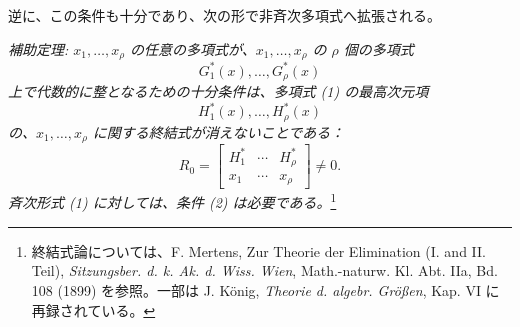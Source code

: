 \documentclass[11pt]{jlreq}
\begin{document}
逆に、この条件も十分であり、次の形で非斉次多項式へ拡張される。

\emph{補助定理: $x_1,\ldots,x_\rho$ の任意の多項式が、$x_1,\ldots,x_\rho$ の $\rho$ 個の多項式}
\[
  G_1^*(x),\ldots,G_\rho^*(x)
\]
\emph{上で代数的に整となるための十分条件は、多項式 (1) の最高次元項}
\[
  H_1^*(x),\ldots,H_\rho^*(x)
\]
\emph{の、$x_1,\ldots,x_\rho$ に関する終結式が消えないことである：}
\begin{equation}
  R_0=\left[
  \begin{array}{ccc}
    H_1^*&\cdots&H_\rho^*\\
    x_1&\cdots&x_\rho
  \end{array}
  \right]\ne0.
\tag{2}
\end{equation}
\emph{斉次形式 (1) に対しては、条件 (2) は必要である。}\footnote{終結式論については、F. Mertens, Zur Theorie der Elimination (I. and II. Teil), \emph{Sitzungsber. d. k. Ak. d. Wiss. Wien}, Math.-naturw. Kl. Abt. IIa, Bd. 108 (1899) を参照。一部は J. König, \emph{Theorie d. algebr. Größen}, Kap. VI に再録されている。}
\end{document}
